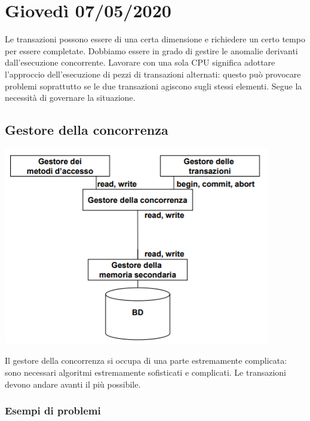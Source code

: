 \chapter{Giovedì 07/05/2020}
Le transazioni possono essere di una certa dimensione e richiedere un certo tempo per essere completate. Dobbiamo essere in grado di gestire le anomalie derivanti dall'esecuzione concorrente. Lavorare con una sola CPU significa adottare l'approccio dell'esecuzione di pezzi di transazioni alternati: questo può provocare problemi soprattutto se le due transazioni agiscono sugli stessi elementi. Segue la necessità di governare la situazione.

\section{Gestore della concorrenza}
\begin{center}
	\includegraphics{images/152.PNG}
\end{center}
Il gestore della concorrenza si occupa di una parte estremamente complicata: sono necessari algoritmi estremamente sofisticati e complicati. Le transazioni devono andare avanti il più possibile. 
\subsection{Esempi di problemi}

